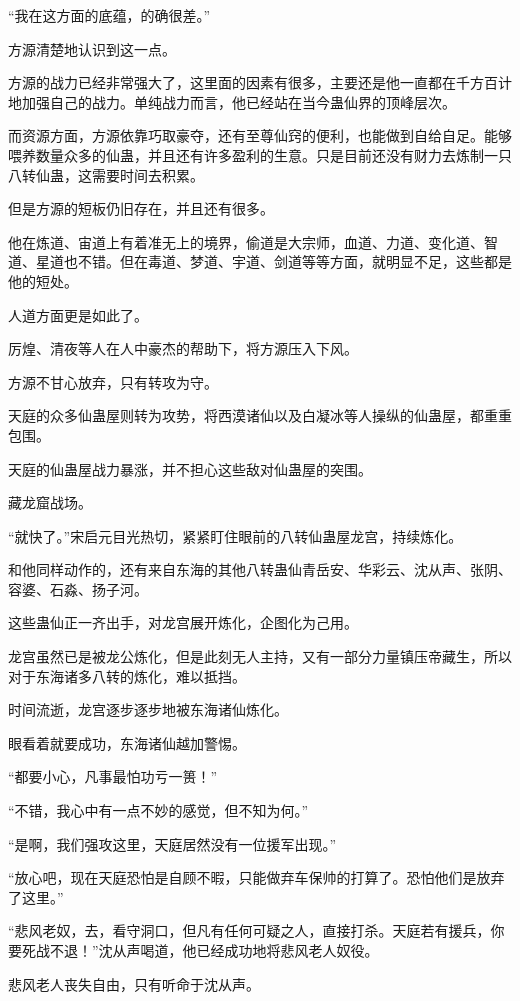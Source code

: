 \begin{this_body}
“我在这方面的底蕴，的确很差。”

方源清楚地认识到这一点。

方源的战力已经非常强大了，这里面的因素有很多，主要还是他一直都在千方百计地加强自己的战力。单纯战力而言，他已经站在当今蛊仙界的顶峰层次。

而资源方面，方源依靠巧取豪夺，还有至尊仙窍的便利，也能做到自给自足。能够喂养数量众多的仙蛊，并且还有许多盈利的生意。只是目前还没有财力去炼制一只八转仙蛊，这需要时间去积累。

但是方源的短板仍旧存在，并且还有很多。

他在炼道、宙道上有着准无上的境界，偷道是大宗师，血道、力道、变化道、智道、星道也不错。但在毒道、梦道、宇道、剑道等等方面，就明显不足，这些都是他的短处。

人道方面更是如此了。

厉煌、清夜等人在人中豪杰的帮助下，将方源压入下风。

方源不甘心放弃，只有转攻为守。

天庭的众多仙蛊屋则转为攻势，将西漠诸仙以及白凝冰等人操纵的仙蛊屋，都重重包围。

天庭的仙蛊屋战力暴涨，并不担心这些敌对仙蛊屋的突围。

藏龙窟战场。

“就快了。”宋启元目光热切，紧紧盯住眼前的八转仙蛊屋龙宫，持续炼化。

和他同样动作的，还有来自东海的其他八转蛊仙青岳安、华彩云、沈从声、张阴、容婆、石淼、扬子河。

这些蛊仙正一齐出手，对龙宫展开炼化，企图化为己用。

龙宫虽然已是被龙公炼化，但是此刻无人主持，又有一部分力量镇压帝藏生，所以对于东海诸多八转的炼化，难以抵挡。

时间流逝，龙宫逐步逐步地被东海诸仙炼化。

眼看着就要成功，东海诸仙越加警惕。

“都要小心，凡事最怕功亏一篑！”

“不错，我心中有一点不妙的感觉，但不知为何。”

“是啊，我们强攻这里，天庭居然没有一位援军出现。”

“放心吧，现在天庭恐怕是自顾不暇，只能做弃车保帅的打算了。恐怕他们是放弃了这里。”

“悲风老奴，去，看守洞口，但凡有任何可疑之人，直接打杀。天庭若有援兵，你要死战不退！”沈从声喝道，他已经成功地将悲风老人奴役。

悲风老人丧失自由，只有听命于沈从声。


\end{this_body}
